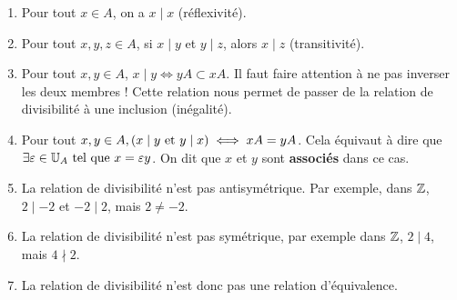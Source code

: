 \documentclass[12pt, a4paper]{report}
\begin{document}
\begin{property}
    \label{property:divisibilite}
    \begin{enumerate}
        \item Pour tout $x\in A$, on a $x\mid x$ (réflexivité).
        \item Pour tout $x,y,z \in A$, si $x\mid y$ et $y\mid z$, alors $x\mid z$ (transitivité).
        \item Pour tout $x,y\in A$, $x\mid y \iff yA \subset xA$. Il faut faire attention à ne pas inverser les deux membres ! Cette relation nous permet de passer de la relation de divisibilité à une inclusion (inégalité).
        \item Pour tout $x,y \in A, (x\mid y \text{ et } y \mid x) \iff xA = yA$. Cela équivaut à dire que $\exists \varepsilon \in \mathbb{U}_A \text{ tel que } x = \varepsilon y$. On dit que $x$ et $y$ sont \textbf{associés} dans ce cas.
        \item La relation de divisibilité n'est pas antisymétrique. Par exemple, dans $\mathbb{Z}$, $2\mid -2$ et $-2\mid 2$, mais $2 \neq -2$.
        \item La relation de divisibilité n'est pas symétrique, par exemple dans $\mathbb{Z}$, $2\mid 4$, mais $4 \nmid 2$.
        \item La relation de divisibilité n'est donc pas une relation d'équivalence.
    \end{enumerate}
\end{property}
\end{document}
